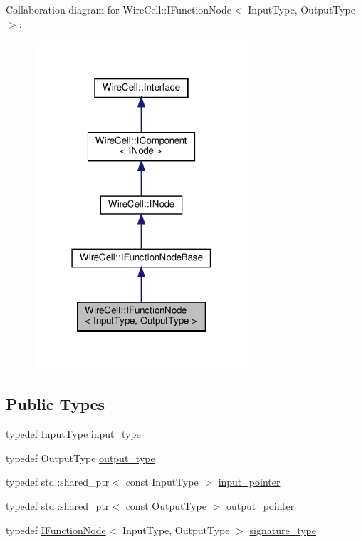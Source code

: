 Collaboration diagram for Wire\+Cell\+:\+:I\+Function\+Node$<$ Input\+Type, Output\+Type $>$\+:
\nopagebreak
\begin{figure}[H]
\begin{center}
\leavevmode
\includegraphics[width=226pt]{class_wire_cell_1_1_i_function_node__coll__graph}
\end{center}
\end{figure}
\subsection*{Public Types}
\begin{DoxyCompactItemize}
\item 
typedef Input\+Type \hyperlink{class_wire_cell_1_1_i_function_node_ab27279ed0322558701ea180c0b01ebb4}{input\+\_\+type}
\item 
typedef Output\+Type \hyperlink{class_wire_cell_1_1_i_function_node_a62445b7764d02391731ad3f262bdf6d8}{output\+\_\+type}
\item 
typedef std\+::shared\+\_\+ptr$<$ const Input\+Type $>$ \hyperlink{class_wire_cell_1_1_i_function_node_a55c0946156df9b712b8ad1a0b59b2db6}{input\+\_\+pointer}
\item 
typedef std\+::shared\+\_\+ptr$<$ const Output\+Type $>$ \hyperlink{class_wire_cell_1_1_i_function_node_afc02f1ec60d31aacddf64963f9ca650b}{output\+\_\+pointer}
\item 
typedef \hyperlink{class_wire_cell_1_1_i_function_node}{I\+Function\+Node}$<$ Input\+Type, Output\+Type $>$ \hyperlink{class_wire_cell_1_1_i_function_node_a86cc51379625ab1584fd5de9688df262}{signature\+\_\+type}
\end{DoxyCompactItemize}
